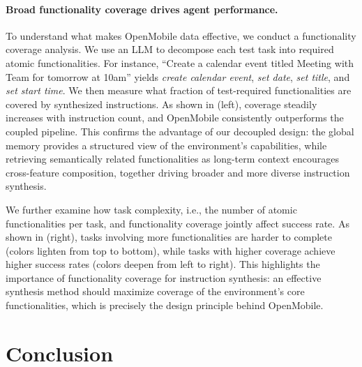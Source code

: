 \documentclass{article} %
\begin{document}
\paragraph{Broad functionality coverage drives agent performance.}
To understand what makes OpenMobile data effective, we conduct a functionality coverage analysis.
We use an LLM to decompose each test task into required atomic functionalities.
For instance, ``Create a calendar event titled Meeting with Team for tomorrow at 10am'' yields \textit{create calendar event}, \textit{set date}, \textit{set title}, and \textit{set start time}.
We then measure what fraction of test-required functionalities are covered by synthesized instructions.
As shown in  (left), coverage steadily increases with instruction count, and OpenMobile consistently outperforms the coupled pipeline.
This confirms the advantage of our decoupled design: the global memory provides a structured view of the environment's capabilities, while retrieving semantically related functionalities as long-term context encourages cross-feature composition, together driving broader and more diverse instruction synthesis.

We further examine how task complexity, i.e., the number of atomic functionalities per task, and functionality coverage jointly affect success rate.
As shown in  (right), tasks involving more functionalities are harder to complete (colors lighten from top to bottom), while tasks with higher coverage achieve higher success rates (colors deepen from left to right).
This highlights the importance of functionality coverage for instruction synthesis: an effective synthesis method should maximize coverage of the environment's core functionalities, which is precisely the design principle behind OpenMobile.

\section{Conclusion}
\end{document}
